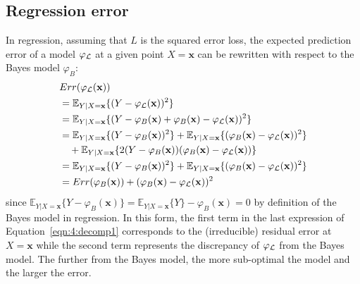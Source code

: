 \subsection{Regression error}

In regression, assuming that $L$ is the squared error loss, the expected
prediction error of a model $\varphi_{\cal L}$ at a given point $X=\mathbf{x}$
can be rewritten with respect to the Bayes model $\varphi_B$:
\begin{align}
& Err(\varphi_{\cal L}(\mathbf{x})) \nonumber \\
&= \mathbb{E}_{Y|X=\mathbf{x}} \{ (Y - \varphi_{\cal L}(\mathbf{x}))^2 \} \nonumber \\
&= \mathbb{E}_{Y|X=\mathbf{x}} \{ (Y -\varphi_B(\mathbf{x}) + \varphi_B(\mathbf{x}) - \varphi_{\cal L}(\mathbf{x}))^2 \} \nonumber \\
&= \mathbb{E}_{Y|X=\mathbf{x}} \{ (Y -\varphi_B(\mathbf{x}))^2  \} + \mathbb{E}_{Y|X=\mathbf{x}} \{ (\varphi_B(\mathbf{x}) - \varphi_{\cal L}(\mathbf{x}))^2 \} \nonumber \\
& \quad+ \mathbb{E}_{Y|X=\mathbf{x}} \{ 2 (Y - \varphi_B(\mathbf{x}))(\varphi_B(\mathbf{x}) - \varphi_{\cal L}(\mathbf{x})) \} \nonumber \\
&= \mathbb{E}_{Y|X=\mathbf{x}} \{ (Y -\varphi_B(\mathbf{x}))^2 \} + \mathbb{E}_{Y|X=\mathbf{x}} \{ (\varphi_B(\mathbf{x}) - \varphi_{\cal L}(\mathbf{x}))^2 \} \nonumber \\
&= Err(\varphi_B(\mathbf{x})) +  (\varphi_B(\mathbf{x}) - \varphi_{\cal L}(\mathbf{x}))^2 \label{eqn:4:decomp1}
\end{align}
since $\mathbb{E}_{Y|X=\mathbf{x}} \{ Y - \varphi_B(\mathbf{x}) \} =
\mathbb{E}_{Y|X=\mathbf{x}} \{ Y \} - \varphi_B(\mathbf{x}) = 0$ by definition
of the Bayes model in regression. In this form, the first term in the last
expression of Equation~\ref{eqn:4:decomp1} corresponds to the (irreducible)
residual error  at $X=\mathbf{x}$ while the second term represents the
discrepancy of $\varphi_{\cal L}$ from the Bayes model. The further from the
Bayes model, the more sub-optimal the model and the larger the error.

